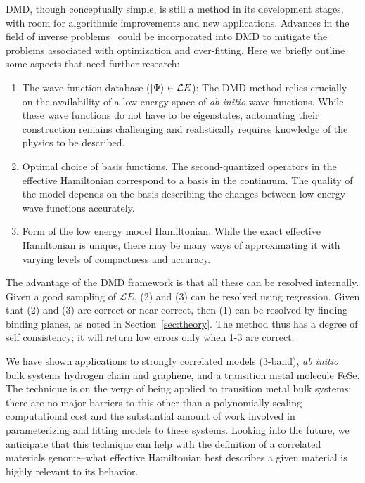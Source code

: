 DMD, though conceptually simple, is still a method in its development stages, with room for algorithmic improvements and new applications. 
Advances in the field of inverse problems~\cite{Berg2017} could be incorporated into DMD to 
mitigate the problems associated with optimization and over-fitting. 
Here we briefly outline some aspects that need further research:
\begin{enumerate}
	\item The wave function database ($\ket{\Psi} \in {\mathcal LE}$):
	The DMD method relies crucially on the availability of a low energy space of \textit{ab initio} wave functions. While these wave functions do not have to be eigenstates, automating their construction remains challenging and realistically requires knowledge of the physics to be described.
	\item Optimal choice of basis functions. The second-quantized operators in the effective Hamiltonian correspond to a basis in the continuum. The quality of the model depends on the basis describing the changes between low-energy wave functions accurately.
	\item Form of the low energy model Hamiltonian. While the exact effective Hamiltonian is unique, there may be many ways of approximating it with varying levels of compactness and accuracy.
\end{enumerate} 
The advantage of the DMD framework is that all these can be resolved internally.
Given a good sampling of ${\mathcal LE}$, (2) and (3) can be resolved using regression. 
Given that (2) and (3) are correct or near correct, then (1) can be resolved by finding binding planes, as noted in Section~\ref{sec:theory}.
The method thus has a degree of self consistency; it will return low errors only when 1-3 are correct.

We have shown applications to strongly correlated models (3-band), {\it ab initio} bulk systems hydrogen chain and graphene, and a transition metal molecule FeSe.
The technique is on the verge of being applied to transition metal bulk systems; there are no major barriers to this other than a polynomially scaling computational cost and the substantial amount of work involved in parameterizing and fitting models to these systems.
Looking into the future, we anticipate that this technique can help with the definition of a correlated materials genome--what effective Hamiltonian best describes a given material is highly relevant to its behavior.


